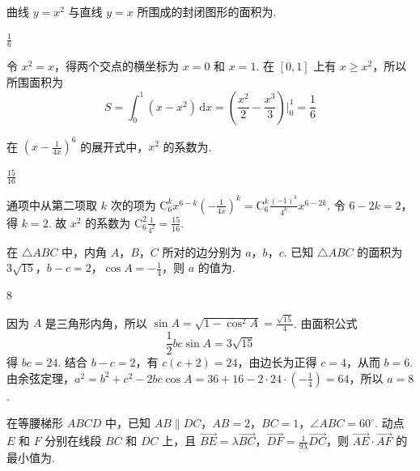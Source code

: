 \begin{problem}
曲线 \( y = x^{2} \) 与直线 \( y = x \) 所围成的封闭图形的面积为\fillinblank{}.
\end{problem}

\begin{answer}
\(\frac{1}{6}\)
\end{answer}

\begin{solution}
令 \(x^2=x\)，得两个交点的横坐标为 \(x=0\) 和 \(x=1\). 在 \([0,1]\) 上有 \(x\geqslant x^2\)，所以所围面积为
\[
S=\int_0^1(x-x^2)\,\mathrm{d}x=\left(\frac{x^2}{2}-\frac{x^3}{3}\right)\Big|_0^1=\frac16
\]
\end{solution}

\begin{problem}
在 \(\left(x - \frac{1}{4x}\right)^6\) 的展开式中，\(x^2\) 的系数为\fillinblank{}.
\end{problem}

\begin{answer}
\(\frac{15}{16}\)
\end{answer}

\begin{solution}
通项中从第二项取 \(k\) 次的项为 \(\mathrm C_6^k x^{6-k}\left(-\frac{1}{4x}\right)^k=\mathrm C_6^k\frac{(-1)^k}{4^k}x^{6-2k}\). 令 \(6-2k=2\)，得 \(k=2\). 故 \(x^2\) 的系数为 \(\mathrm C_6^2\frac{1}{4^2}=\frac{15}{16}\).
\end{solution}

\begin{problem}
在 \(\triangle ABC\) 中，内角 \(A\)，\(B\)，\(C\) 所对的边分别为 \(a\)，\(b\)，\(c\). 已知 \(\triangle ABC\) 的面积为 \(3\sqrt{15}\)，\(b - c = 2\)，\(\cos A = -\frac{1}{4}\)，则 \(a\) 的值为\fillinblank{}.
\end{problem}

\begin{answer}
\(8\)
\end{answer}

\begin{solution}
因为 \(A\) 是三角形内角，所以 \(\sin A=\sqrt{1-\cos^2A}=\frac{\sqrt{15}}4\). 由面积公式
\[
\frac12bc\sin A=3\sqrt{15}
\]
得 \(bc=24\). 结合 \(b-c=2\)，有 \(c(c+2)=24\)，由边长为正得 \(c=4\)，从而 \(b=6\). 由余弦定理，\(a^2=b^2+c^2-2bc\cos A=36+16-2\cdot24\cdot\left(-\frac14\right)=64\)，所以 \(a=8\).
\end{solution}

\begin{problem}
在等腰梯形 \(ABCD\) 中，已知 \(AB \parallel DC\)，\(AB = 2\)，\(BC = 1\)，\(\angle ABC = 60^\circ\). 动点 \(E\) 和 \(F\) 分别在线段 \(BC\) 和 \(DC\) 上，且 \(\overrightarrow{BE} = \lambda \overrightarrow{BC}\)，\(\overrightarrow{DF} = \frac{1}{9\lambda}\overrightarrow{DC}\)，则 \(\overrightarrow{AE} \cdot \overrightarrow{AF}\) 的最小值为\fillinblank{}.
\end{problem}

